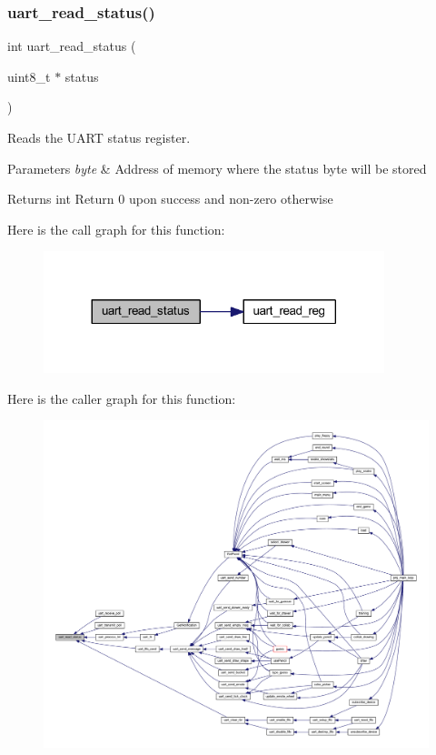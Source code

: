 \subsubsection{\texorpdfstring{uart\+\_\+read\+\_\+status()}{uart\_read\_status()}}
{\footnotesize\ttfamily int uart\+\_\+read\+\_\+status (\begin{DoxyParamCaption}\item[{uint8\+\_\+t $\ast$}]{status }\end{DoxyParamCaption})}



Reads the U\+A\+RT status register. 


\begin{DoxyParams}{Parameters}
{\em byte} & Address of memory where the status byte will be stored \\
\hline
\end{DoxyParams}
\begin{DoxyReturn}{Returns}
int Return 0 upon success and non-\/zero otherwise 
\end{DoxyReturn}
Here is the call graph for this function\+:\nopagebreak
\begin{figure}[H]
\begin{center}
\leavevmode
\includegraphics[width=281pt]{group__uart_ga2489cf587ed0d39db2aafebba69d6b6d_cgraph}
\end{center}
\end{figure}
Here is the caller graph for this function\+:\nopagebreak
\begin{figure}[H]
\begin{center}
\leavevmode
\includegraphics[width=350pt]{group__uart_ga2489cf587ed0d39db2aafebba69d6b6d_icgraph}
\end{center}
\end{figure}
